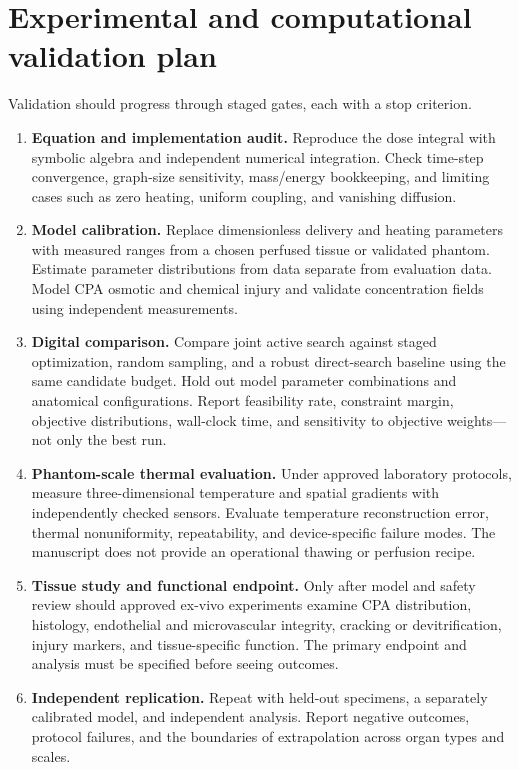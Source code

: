 \documentclass[11pt]{article}
\begin{document}
\section{Experimental and computational validation plan}

Validation should progress through staged gates, each with a stop criterion.
\begin{enumerate}
\item \textbf{Equation and implementation audit.} Reproduce the dose integral with symbolic algebra and independent numerical integration. Check time-step convergence, graph-size sensitivity, mass/energy bookkeeping, and limiting cases such as zero heating, uniform coupling, and vanishing diffusion.
\item \textbf{Model calibration.} Replace dimensionless delivery and heating parameters with measured ranges from a chosen perfused tissue or validated phantom. Estimate parameter distributions from data separate from evaluation data. Model CPA osmotic and chemical injury and validate concentration fields using independent measurements.
\item \textbf{Digital comparison.} Compare joint active search against staged optimization, random sampling, and a robust direct-search baseline using the same candidate budget. Hold out model parameter combinations and anatomical configurations. Report feasibility rate, constraint margin, objective distributions, wall-clock time, and sensitivity to objective weights—not only the best run.
\item \textbf{Phantom-scale thermal evaluation.} Under approved laboratory protocols, measure three-dimensional temperature and spatial gradients with independently checked sensors. Evaluate temperature reconstruction error, thermal nonuniformity, repeatability, and device-specific failure modes. The manuscript does not provide an operational thawing or perfusion recipe.
\item \textbf{Tissue study and functional endpoint.} Only after model and safety review should approved ex-vivo experiments examine CPA distribution, histology, endothelial and microvascular integrity, cracking or devitrification, injury markers, and tissue-specific function. The primary endpoint and analysis must be specified before seeing outcomes.
\item \textbf{Independent replication.} Repeat with held-out specimens, a separately calibrated model, and independent analysis. Report negative outcomes, protocol failures, and the boundaries of extrapolation across organ types and scales.
\end{enumerate}
\end{document}

